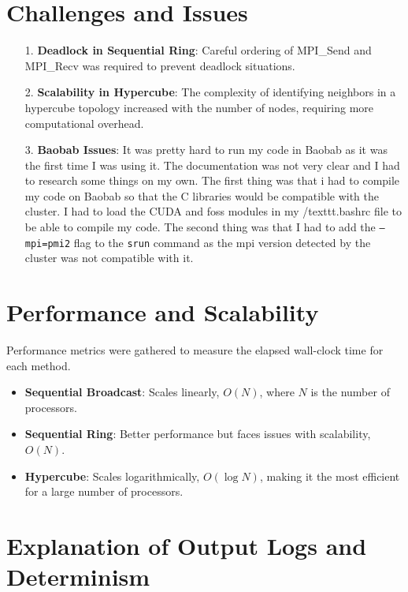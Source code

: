 \documentclass[11pt]{article}
\begin{document}
\section{Challenges and Issues}
\begin{itemize}
    \item [1.] \textbf{Deadlock in Sequential Ring}: Careful ordering of MPI\_Send and MPI\_Recv was required to prevent deadlock situations.
    \item [2.] \textbf{Scalability in Hypercube}: The complexity of identifying neighbors in a hypercube topology increased with the number of nodes, requiring more computational overhead.
    \item [3.] \textbf{Baobab Issues}: It was pretty hard to run my code in Baobab as it was the first time I was using it. The documentation was not very clear and I had to research some things on my own.
The first thing was that i had to compile my code on Baobab so that the C libraries would be compatible with the cluster. I had to load the CUDA and foss modules in my /texttt{.bashrc} file to be able to compile my code. 
The second thing was that I had to add the \texttt{--mpi=pmi2} flag to the \texttt{srun} command as the mpi version detected by the cluster was not compatible with it.
\end{itemize}

\section{Performance and Scalability}

Performance metrics were gathered to measure the elapsed wall-clock time for each method.

\begin{itemize}
    \item \textbf{Sequential Broadcast}: Scales linearly, $O(N)$, where $N$ is the number of processors.
    \item \textbf{Sequential Ring}: Better performance but faces issues with scalability, $O(N)$.
    \item \textbf{Hypercube}: Scales logarithmically, $O(\log N)$, making it the most efficient for a large number of processors.
\end{itemize}

\section{Explanation of Output Logs and Determinism}
\end{document}
